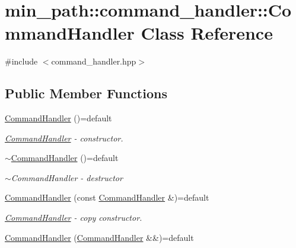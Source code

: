 \hypertarget{classmin__path_1_1command__handler_1_1_command_handler}{}\section{min\+\_\+path\+:\+:command\+\_\+handler\+:\+:Command\+Handler Class Reference}
\label{classmin__path_1_1command__handler_1_1_command_handler}


{\ttfamily \#include $<$command\+\_\+handler.\+hpp$>$}

\subsection*{Public Member Functions}
\begin{DoxyCompactItemize}
\item 
\hyperlink{classmin__path_1_1command__handler_1_1_command_handler_a65cf4692821f3207a8db5653a531327f}{Command\+Handler} ()=default
\begin{DoxyCompactList}\small\item\em \hyperlink{classmin__path_1_1command__handler_1_1_command_handler}{Command\+Handler} -\/ constructor. \end{DoxyCompactList}\item 
\hyperlink{classmin__path_1_1command__handler_1_1_command_handler_a6921219aa860305c8c39feffa2e3ee3b}{$\sim$\+Command\+Handler} ()=default
\begin{DoxyCompactList}\small\item\em $\sim$\+Command\+Handler -\/ destructor \end{DoxyCompactList}\item 
\hyperlink{classmin__path_1_1command__handler_1_1_command_handler_a98c7fbeab225fbd65b80ad3b7c19240e}{Command\+Handler} (const \hyperlink{classmin__path_1_1command__handler_1_1_command_handler}{Command\+Handler} \&)=default
\begin{DoxyCompactList}\small\item\em \hyperlink{classmin__path_1_1command__handler_1_1_command_handler}{Command\+Handler} -\/ copy constructor. \end{DoxyCompactList}\item 
\hyperlink{classmin__path_1_1command__handler_1_1_command_handler_ab7256adfaa1dddd182a3804e0acec7e7}{Command\+Handler} (\hyperlink{classmin__path_1_1command__handler_1_1_command_handler}{Command\+Handler} \&\&)=default
\begin{DoxyCompactList}\small\item\em 

\end{DoxyCompactList}
\end{DoxyCompactItemize}
